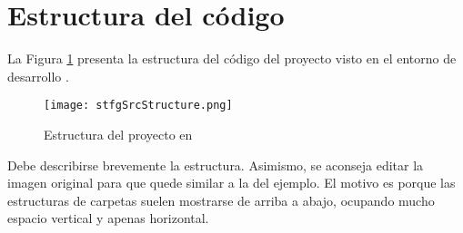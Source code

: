 \section{\forlnameref Estructura del código}
\label{sec:implementationStructure}

La Figura \ref{fig:stfgSrcStructure} presenta la estructura del código del proyecto  visto en el entorno de desarrollo \program{[entorno]}.

\begin{figure}[H]
\centering
\texttt{[image: stfgSrcStructure.png]}
\caption{Estructura del proyecto en }
\label{fig:stfgSrcStructure}
\end{figure}

\begin{shaded}
Debe describirse brevemente la estructura. Asimismo, se aconseja editar la imagen original para que quede similar a la del ejemplo. El motivo es porque las estructuras de carpetas suelen mostrarse de arriba a abajo, ocupando mucho espacio vertical y apenas horizontal.
\end{shaded}